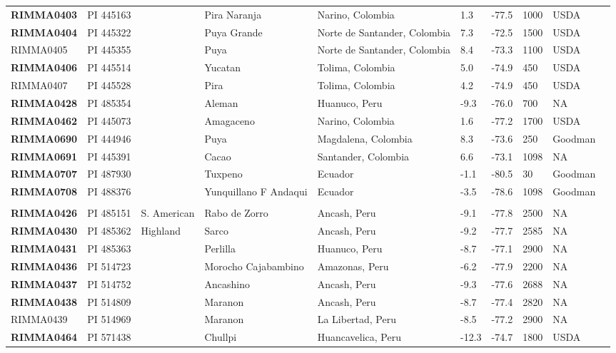 \begin{table}[h]
\begin{center}
{\begin{tabular}{llllllllll}
{\bf RIMMA0403}	&	PI 445163	&		&	Pira Naranja	&	Narino, Colombia	&	1.3 	&	-77.5 	&	1000	&	USDA	\\
{\bf RIMMA0404}	&	PI 445322	&		&	Puya Grande	&	Norte de Santander, Colombia	&	7.3 	&	-72.5 	&	1500	&	USDA	\\
RIMMA0405	&	PI 445355	&		&	Puya	&	Norte de Santander, Colombia	&	8.4 	&	-73.3 	&	1100	&	USDA	\\
{\bf RIMMA0406}	&	PI 445514	&		&	Yucatan	&	Tolima, Colombia	&	5.0 	&	-74.9 	&	450	&	USDA	\\
RIMMA0407	&	PI 445528	&		&	Pira	&	Tolima, Colombia	&	4.2 	&	-74.9 	&	450	&	USDA	\\
{\bf RIMMA0428}	&	PI 485354	&		&	Aleman	&	Huanuco, Peru	&	-9.3 	&	-76.0 	&	700	&	NA	\\
{\bf RIMMA0462}	&	PI 445073	&		&	Amagaceno	&	Narino, Colombia	&	1.6 	&	-77.2 	&	1700	&	USDA	\\
{\bf RIMMA0690}	&	PI 444946	&		&	Puya	&	Magdalena, Colombia	&	8.3 	&	-73.6 	&	250	&	Goodman	\\
{\bf RIMMA0691}	&	PI 445391	&		&	Cacao	&	Santander, Colombia	&	6.6 	&	-73.1 	&	1098	&	NA	\\
{\bf RIMMA0707}	&	PI 487930	&		&	Tuxpeno	&	Ecuador	&	-1.1 	&	-80.5 	&	30	&	Goodman	\\
{\bf RIMMA0708}	&	PI 488376	&		&	Yunquillano F Andaqui	&	Ecuador	&	-3.5 	&	-78.6 	&	1098	&	Goodman	\\
	\hline 
	& & & \\[-4mm] 
{\bf RIMMA0426}	&	PI 485151	&	S. American	&	Rabo de Zorro	&	Ancash, Peru	&	-9.1 	&	-77.8 	&	2500	&	NA	\\
{\bf RIMMA0430}	&	PI 485362	&	Highland	&	Sarco	&	Ancash, Peru	&	-9.2 	&	-77.7 	&	2585	&	NA	\\
{\bf RIMMA0431}	&	PI 485363	&	 	&	Perlilla	&	Huanuco, Peru	&	-8.7 	&	-77.1 	&	2900	&	NA	\\
{\bf RIMMA0436}	&	PI 514723	&		&	Morocho Cajabambino	&	Amazonas, Peru	&	-6.2 	&	-77.9 	&	2200	&	NA	\\
{\bf RIMMA0437}	&	PI 514752	&		&	Ancashino	&	Ancash, Peru	&	-9.3 	&	-77.6 	&	2688	&	NA	\\
{\bf RIMMA0438}	&	PI 514809	&		&	Maranon	&	Ancash, Peru	&	-8.7 	&	-77.4 	&	2820	&	NA	\\
RIMMA0439	&	PI 514969	&		&	Maranon	&	La Libertad, Peru	&	-8.5 	&	-77.2 	&	2900	&	NA	\\
{\bf RIMMA0464}	&	PI 571438	&		&	Chullpi	&	Huancavelica, Peru	&	-12.3 	&	-74.7 	&	1800	&	USDA	\\

\end{tabular}}
\end{center}
\end{table}
